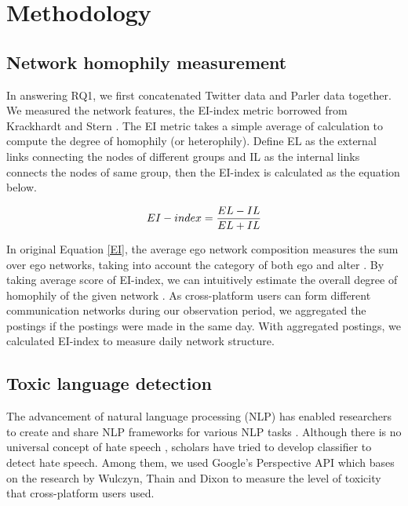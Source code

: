 \documentclass[Crown,sagev,times]{sagej}
\begin{document}
\section{Methodology} \label{sec:methodology}
 
\subsection{Network homophily measurement} \label{sec:network}

In answering RQ1, we first concatenated Twitter data and Parler data together.
We measured the network features, the EI-index metric borrowed 
from Krackhardt and Stern \cite{krackhardt1988informal}.
The EI metric takes a simple average of calculation to compute the degree 
of homophily (or heterophily). 
Define EL as the external links connecting the nodes of different groups and IL 
as the internal links connects the nodes of same group, then the EI-index is calculated as the equation below. 
 
\begin{equation}
\centering
EI-index = \frac{EL - IL}{EL + IL}  
\label{EI}
\vspace{2mm}
\end{equation}
 
In original Equation \ref{EI}, the average ego network composition measures 
the sum over ego networks, taking into account the category of both ego 
and alter \cite{berry2021estimating}. By taking average score of EI-index, 
we can intuitively estimate the overall degree of homophily of the given network
\cite{berry2021estimating}. As cross-platform users can form different communication
networks during our observation period, we aggregated the postings if the 
postings were made in the same day. With aggregated postings, 
we calculated EI-index to measure daily network structure. 
 
\subsection{Toxic language detection} \label{sec:toxicity}
 
The advancement of natural language processing (NLP) has enabled researchers to
create and share NLP frameworks for various NLP tasks \cite{park2022raison, park2023ripple}.
Although there is no universal concept of hate speech \cite{Weber_2009}, 
scholars have tried to develop classifier to detect hate speech. 
Among them, we used Google's Perspective API which bases on the research by 
Wulczyn, Thain and Dixon \cite{wulczyn2017ex} to measure the level of toxicity 
that cross-platform users used.
\end{document}
